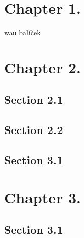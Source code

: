 
\def\PageLayout{single-no-print}
\def\DocLanguage{en}
\def\PackagesIncludeBib{yes}







\usepackage{lipsum}  %







\tableofcontents

\newpage
{}
\setcounter{page}{1}


\pagestyle{fancy}


\chapter{Chapter 1.}

\lipsum[1-3]  %

wau balíček \cite{Iizuka2002}
\chapter{Chapter 2.}

\lipsum[1-3]  %

\section{Section 2.1}
\lipsum[1-3]  %

\section{Section 2.2}
\lipsum[1-3]  %

\section{Section 3.1}

\lipsum[1-6]

\chapter{Chapter 3.}

\lipsum[1-5]

\section{Section 3.1}

\lipsum[2-4]










\listoffigures

\listoftables

\clearpage
\openright

